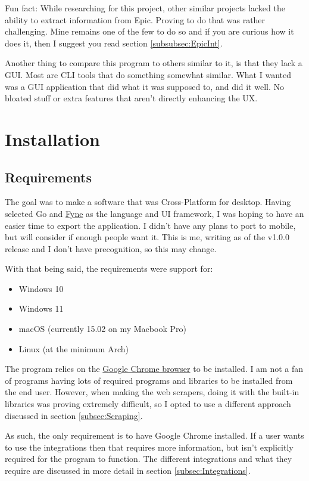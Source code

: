 \documentclass[letterpaper,12pt]{article}
\begin{document}
Fun fact: While researching for this project, other similar
projects lacked the ability to extract information from Epic.
Proving to do that was rather challenging. Mine remains one of the
few to do so and if you are curious how it does it, then I suggest
you read section \ref{subsubsec:EpicInt}.

Another thing to compare this program to others similar to it, is
that they lack a GUI. Most are CLI tools that do something somewhat similar.
What I wanted was a GUI application that did what it was supposed to,
and did it well. No bloated stuff or extra features that aren't
directly enhancing the UX.

\section{Installation}

\subsection{Requirements}

The goal was to make a software that was Cross-Platform for desktop.
Having selected Go and \href{https://fyne.io/}{Fyne} as the language and UI
framework, I was hoping to have an easier time to export the application.
I didn't have any plans to port to mobile, but will consider if
enough people want it. This is me, writing as of the v1.0.0 release
and I don't have precognition, so this may change.

With that being said, the requirements were support for:
\begin{itemize}
	\item Windows 10
	\item Windows 11
	\item macOS (currently 15.02 on my Macbook Pro)
	\item Linux (at the minimum Arch)
\end{itemize}

The program relies on the
\href{https://www.google.com/chrome/}{Google Chrome browser} to be installed.
I am not a fan of programs having lots of required programs and
libraries to be installed from the end user.
However, when making the web scrapers, doing it with the built-in
libraries was proving extremely difficult, so I opted to use a
different approach discussed in section \ref{subsec:Scraping}.

As such, the only requirement is to have Google Chrome installed.
If a user wants to use the integrations then that requires more
information, but isn't explicitly required for the program to function.
The different integrations and what they require are discussed in
more detail in section \ref{subsec:Integrations}.
\end{document}
